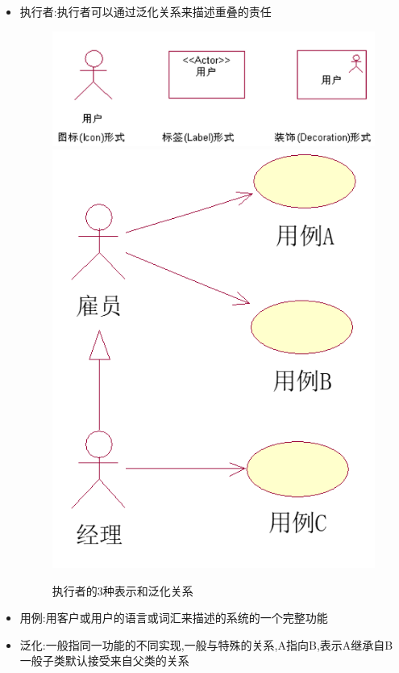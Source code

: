 \documentclass[UTF8,a4paper]{ctexart}
\begin{document}
\begin{itemize}
  \item 执行者:执行者可以通过泛化关系来描述重叠的责任
  \begin{figure}[H]
    \centering
    \includegraphics[scale = 0.3]{assets/SoftwareEngineering_fe408.png}
    \includegraphics[scale = 0.3]{assets/SoftwareEngineering_8aab7.png}
    \caption{执行者的3种表示和泛化关系}
  \end{figure}
  \item 用例:用客户或用户的语言或词汇来描述的系统的一个完整功能
  \item 泛化:一般指同一功能的不同实现,一般与特殊的关系,A指向B,表示A继承自B
  一般子类默认接受来自父类的关系

\end{itemize}
\end{document}
